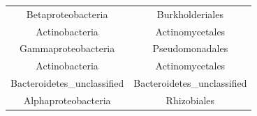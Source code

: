 \documentclass[]{article}
\begin{document}
\begin{longtable}[]{@{}cc@{}}
\begin{minipage}[t]{0.38\columnwidth}
Betaproteobacteria\strut
\end{minipage} & \begin{minipage}[t]{0.39\columnwidth}\centering
Burkholderiales\strut
\end{minipage}\tabularnewline
\begin{minipage}[t]{0.38\columnwidth}\centering
Actinobacteria\strut
\end{minipage} & \begin{minipage}[t]{0.39\columnwidth}\centering
Actinomycetales\strut
\end{minipage}\tabularnewline
\begin{minipage}[t]{0.38\columnwidth}\centering
Gammaproteobacteria\strut
\end{minipage} & \begin{minipage}[t]{0.39\columnwidth}\centering
Pseudomonadales\strut
\end{minipage}\tabularnewline
\begin{minipage}[t]{0.38\columnwidth}\centering
Actinobacteria\strut
\end{minipage} & \begin{minipage}[t]{0.39\columnwidth}\centering
Actinomycetales\strut
\end{minipage}\tabularnewline
\begin{minipage}[t]{0.38\columnwidth}\centering
Bacteroidetes\_unclassified\strut
\end{minipage} & \begin{minipage}[t]{0.39\columnwidth}\centering
Bacteroidetes\_unclassified\strut
\end{minipage}\tabularnewline
\begin{minipage}[t]{0.38\columnwidth}\centering
Alphaproteobacteria\strut
\end{minipage} & \begin{minipage}[t]{0.39\columnwidth}\centering
Rhizobiales\strut
\end{minipage}\tabularnewline
\bottomrule
\end{longtable}
\end{document}
